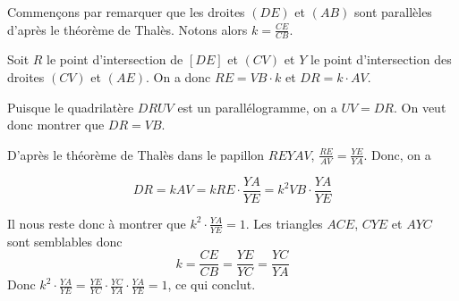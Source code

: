 \begin{sol}
\begin{center}
\end{center}

Commençons par remarquer que les droites $(DE)$ et $(AB)$ sont parallèles d'après le théorème de Thalès. Notons alors $k = \frac{CE}{CB}$.

\medskip

Soit $R$ le point d'intersection de $[DE]$ et $(CV)$ et $Y$ le point d'intersection des droites $(CV)$ et $(AE)$. On a donc $RE = VB \cdot k$ et $DR = k \cdot AV$.

Puisque le quadrilatère $DRUV$ est un parallélogramme, on a $UV = DR$. On veut donc montrer que $DR = VB$.

D'après le théorème de Thalès dans le papillon $REYAV$, $\frac{RE}{AV} = \frac{YE}{YA}$. Donc, on a

$$DR = kAV = k RE \cdot \frac{YA}{YE} = k^2 VB\cdot \frac{YA}{YE}$$

Il nous reste donc à montrer que $k^2 \cdot \frac{YA}{YE} = 1$. Les triangles $ACE$, $CYE$ et $AYC$ sont semblables donc
$$ k = \frac{CE}{CB} = \frac{YE}{YC} = \frac{YC}{YA}$$
Donc $k^2 \cdot \frac{YA}{YE} = \frac{YE}{YC} \cdot \frac{YC}{YA} \cdot \frac{YA}{YE} = 1$, ce qui conclut.
\end{sol}


